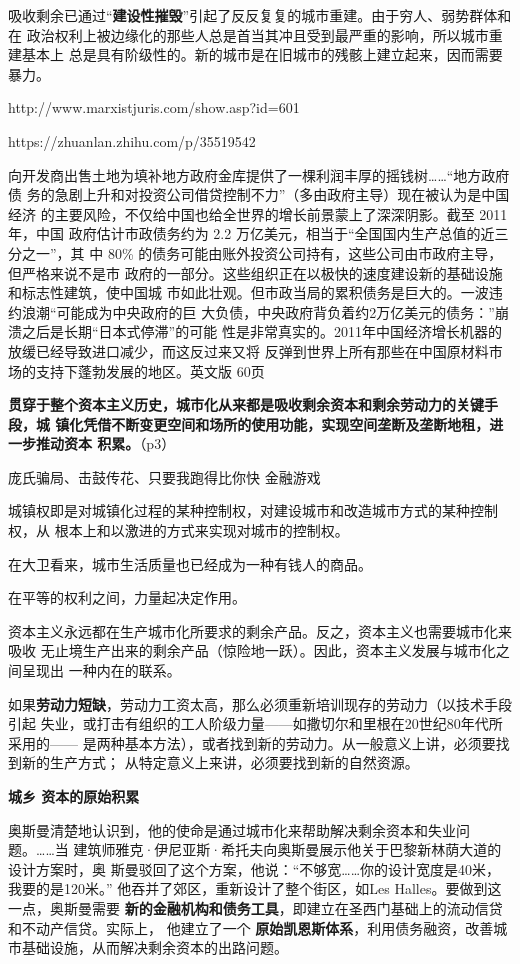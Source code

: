 吸收剩余已通过“\textbf{建设性摧毁}”引起了反反复复的城市重建。由于穷人、弱势群体和在
政治权利上被边缘化的那些人总是首当其冲且受到最严重的影响，所以城市重建基本上
总是具有阶级性的。新的城市是在旧城市的残骸上建立起来，因而需要暴力。

http://www.marxistjuris.com/show.asp?id=601

https://zhuanlan.zhihu.com/p/35519542

向开发商出售土地为填补地方政府金库提供了一棵利润丰厚的摇钱树……“地方政府债
务的急剧上升和对投资公司借贷控制不力”（多由政府主导）现在被认为是中国经济
的主要风险，不仅给中国也给全世界的增长前景蒙上了深深阴影。截至 2011 年，中国
政府估计市政债务约为 2.2 万亿美元，相当于“全国国内生产总值的近三分之一”，其
中 80\% 的债务可能由账外投资公司持有，这些公司由市政府主导，但严格来说不是市
政府的一部分。这些组织正在以极快的速度建设新的基础设施和标志性建筑，使中国城
市如此壮观。但市政当局的累积债务是巨大的。一波违约浪潮“可能成为中央政府的巨
大负债，中央政府背负着约2万亿美元的债务：”崩溃之后是长期“日本式停滞”的可能
性是非常真实的。2011年中国经济增长机器的放缓已经导致进口减少，而这反过来又将
反弹到世界上所有那些在中国原材料市场的支持下蓬勃发展的地区。英文版 60页



\textbf{贯穿于整个资本主义历史，城市化从来都是吸收剩余资本和剩余劳动力的关键手段，城
镇化凭借不断变更空间和场所的使用功能，实现空间垄断及垄断地租，进一步推动资本
积累。}（p3）

庞氏骗局、击鼓传花、只要我跑得比你快  金融游戏


城镇权即是对城镇化过程的某种控制权，对建设城市和改造城市方式的某种控制权，从
根本上和以激进的方式来实现对城市的控制权。

在大卫看来，城市生活质量也已经成为一种有钱人的商品。

在平等的权利之间，力量起决定作用。

资本主义永远都在生产城市化所要求的剩余产品。反之，资本主义也需要城市化来吸收
无止境生产出来的剩余产品（惊险地一跃）。因此，资本主义发展与城市化之间呈现出
一种内在的联系。

如果\textbf{劳动力短缺}，劳动力工资太高，那么必须重新培训现存的劳动力（以技术手段引起
失业，或打击有组织的工人阶级力量——如撒切尔和里根在20世纪80年代所采用的——
是两种基本方法），或者找到新的劳动力。从一般意义上讲，必须要找到新的生产方式；
从特定意义上来讲，必须要找到新的自然资源。

\textbf{城乡 资本的原始积累}

奥斯曼清楚地认识到，他的使命是通过城市化来帮助解决剩余资本和失业问题。……当
建筑师雅克·伊尼亚斯·希托夫向奥斯曼展示他关于巴黎新林荫大道的设计方案时，奥
斯曼驳回了这个方案，他说：“不够宽……你的设计宽度是40米，我要的是120米。”
他吞并了郊区，重新设计了整个街区，如Les Halles。要做到这一点，奥斯曼需要\textbf{
新的金融机构和债务工具}，即建立在圣西门基础上的流动信贷和不动产信贷。实际上，
他建立了一个 \textbf{原始凯恩斯体系}，利用债务融资，改善城市基础设施，从而解决剩余资本的出路问题。

